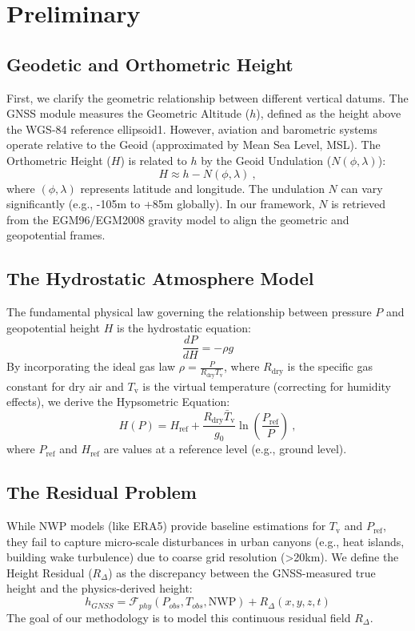 \section{Preliminary}
\label{sec:preliminary}
\subsection{Geodetic and Orthometric Height}
First, we clarify the geometric relationship between different vertical datums. The GNSS module measures the Geometric Altitude ($h$), defined as the height above the WGS-84 reference ellipsoid1. However, aviation and barometric systems operate relative to the Geoid (approximated by Mean Sea Level, MSL). The Orthometric Height ($H$) is related to $h$ by the Geoid Undulation ($N(\phi, \lambda)$):
$$H \approx h - N(\phi, \lambda) \ , $$
where $(\phi, \lambda)$ represents latitude and longitude. The undulation $N$ can vary significantly (e.g., -105m to +85m globally). In our framework, $N$ is retrieved from the EGM96/EGM2008 gravity model to align the geometric and geopotential frames.

\subsection{The Hydrostatic Atmosphere Model}
The fundamental physical law governing the relationship between pressure $P$ and geopotential height $H$ is the hydrostatic equation:$$\frac{dP}{dH} = -\rho g$$By incorporating the ideal gas law $\rho = \frac{P}{R_\text{dry} T_\text{v}}$, where $R_\text{dry}$ is the specific gas constant for dry air and $T_\text{v}$ is the virtual temperature (correcting for humidity effects), we derive the Hypsometric Equation:
$$H(P) = H_\text{ref} + \frac{R_\text{dry} \bar{T}_\text{v}}{g_0} \ln\left(\frac{P_\text{ref}}{P}\right) \ ,$$
where $P_\text{ref}$ and $H_\text{ref}$ are values at a reference level (e.g., ground level).

\subsection{The Residual Problem}
While NWP models (like ERA5) provide baseline estimations for $T_\text{v}$ and $P_\text{ref}$, they fail to capture micro-scale disturbances in urban canyons (e.g., heat islands, building wake turbulence) due to coarse grid resolution (>20km). We define the Height Residual ($R_{\Delta}$) as the discrepancy between the GNSS-measured true height and the physics-derived height:$$h_{GNSS} = \mathcal{F}_{phy}(P_{obs}, T_{obs}, \text{NWP}) + R_{\Delta}(x, y, z, t)$$The goal of our methodology is to model this continuous residual field $R_{\Delta}$.